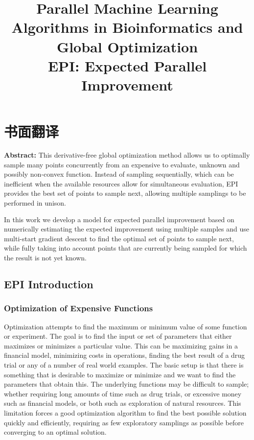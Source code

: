 \chapter{书面翻译}

\title{Parallel Machine Learning Algorithms in Bioinformatics and Global Optimization \\ EPI: Expected Parallel Improvement}

\textbf{Abstract:}
This derivative-free global optimization method allows us to optimally sample many points concurrently from an expensive to evaluate, unknown and possibly non-convex function. Instead of sampling sequentially, which can be inefficient when the available resources allow for simultaneous evaluation, EPI provides the best set of points to sample next, allowing multiple samplings to be performed in unison.

In this work we develop a model for expected parallel improvement based on numerically estimating the expected improvement using multiple samples and use multi-start gradient descent to find the optimal set of points to sample next, while fully taking into account points that are currently being sampled for which the result is not yet known.

\section{EPI Introduction} %
\label{cha:EPI Introduction}

\subsection{Optimization of Expensive Functions}

Optimization attempts to find the maximum or minimum value of some function or experiment. The goal is to find the input or set of parameters that either maximizes or minimizes a particular value. This can be maximizing gains in a financial model, minimizing costs in operations, finding the best result of a drug trial or any of a number of real world examples. The basic setup is that there is something that is desirable to maximize or minimize and we want to find the parameters that obtain this. The underlying functions may be difficult to sample; whether requiring long amounts of time such as drug trials, or excessive money such as financial models, or both such as exploration of natural resources. This limitation forces a good optimization algorithm to find the best possible solution quickly and efficiently, requiring as few exploratory samplings as possible before converging to an optimal solution.

